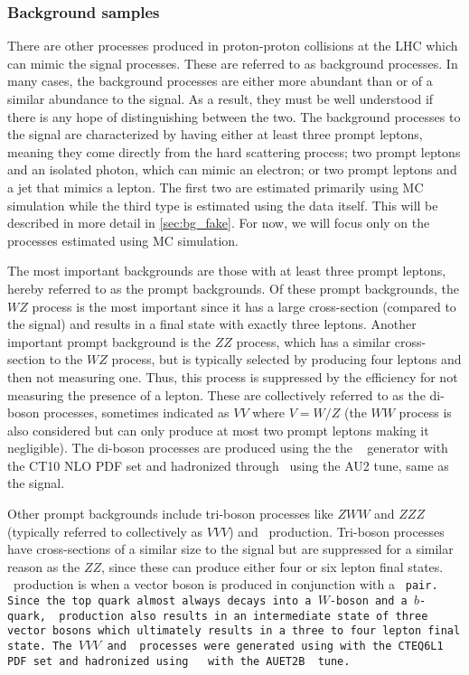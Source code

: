 \subsubsection{Background samples}
\label{sec:www_bg_samples}

There are other processes produced in proton-proton collisions at the LHC
which can mimic the signal processes. These are referred to as background processes.
In many cases, the background processes are either
more abundant than or of a similar abundance to
the signal. As a result, they must be well understood if there is any hope
of distinguishing between the two. The background processes to the signal
are characterized by having either at least three prompt leptons, meaning they
come directly from the hard scattering process;  
two prompt leptons and an isolated photon, which can mimic an electron;
or two prompt leptons and a jet that mimics a lepton.
The first two are estimated primarily using MC simulation while the third type
is estimated using the data itself. 
This will be described in more detail in \sec\ref{sec:bg_fake}.
For now, we will focus only on the processes estimated using MC simulation.

The most important backgrounds are those with at least three prompt leptons, 
hereby referred to as the prompt backgrounds. Of these prompt backgrounds,
the $WZ$ process is the most important since it has a 
large cross-section (compared to the signal)
and results in a final state with exactly three leptons. Another important 
prompt background is the $ZZ$ process,
which has a similar cross-section to the $WZ$ process, but is typically 
selected by producing
four leptons and then not measuring one. Thus, this process is suppressed by the 
efficiency for not measuring the presence of a lepton. 
These are collectively referred to as the di-boson processes, sometimes
indicated as $VV$ where $V=W/Z$ (the $WW$ process is also considered
but can only produce at most two prompt leptons making it negligible). 
The di-boson processes are produced using the 
the \powheg~\cite{Alioli:2008gx,Nason:2004rx,Frixione:2007vw,Alioli:2010xd} generator
with the CT10 NLO PDF set and 
hadronized through \pythiaeight~using the AU2 tune, same as the signal.

Other prompt backgrounds 
include tri-boson processes like $ZWW$ and $ZZZ$ 
(typically referred to collectively as $VVV$)
and \ttV~production. Tri-boson processes
have cross-sections of a similar size to the signal but are suppressed 
for a similar reason
as the $ZZ$, since these can produce either four or six lepton final 
states. 
\ttV~production is when a vector
boson is produced in conjunction with a \tt~pair. 
Since the top quark almost always decays
into a $W$-boson and a $b$-quark, \ttV~production also results in an intermediate
state of three vector bosons which ultimately results in a three to four lepton
final state.
The $VVV$ and \ttV~processes were generated using \madgraph with the 
CTEQ6L1 PDF set and hadronized
using \pythiasix~\cite{PYTHIA} with the AUET2B~\cite{ATL-PHYS-PUB-2011-009} 
tune.


